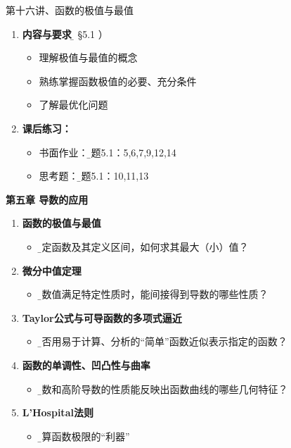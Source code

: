 \begin{frame}{第十六讲、函数的极值与最值}
	\linespread{1.5}
	\begin{enumerate}
	  \item {\bf 内容与要求}{\b（ \S 5.1 ）}
	  \begin{itemize}
	    \item 理解极值与最值的概念
	    \item 熟练掌握函数极值的必要、充分条件
	    \item 了解最优化问题
	  \vspace{1em}
	  \end{itemize}
	  \item {\bf 课后练习：}
	  \begin{itemize}
	    \item 书面作业：{\b 习题5.1：5,6,7,9,12,14}
 	    \item 思考题：{\b 习题5.1：10,11,13}
	  \end{itemize}
	\end{enumerate}
\end{frame}



\begin{frame}{\bf 第五章\; 导数的应用}
	\linespread{1.2}
	\begin{enumerate}\pause 
	  \item {\bf 函数的极值与最值}
	  \begin{itemize}
	    \item {\b 给定函数及其定义区间，如何求其最大（小）值？}
	  \end{itemize}\pause 
	  \item {\bf 微分中值定理}
	  \begin{itemize}
	    \item {\b 函数值满足特定性质时，能间接得到导数的哪些性质？}
	  \end{itemize}\pause 
	  \item {\bf Taylor公式与可导函数的多项式逼近}
	  \begin{itemize}
	    \item {\b 能否用易于计算、分析的“简单”函数近似表示指定的函数？}
	  \end{itemize}\pause 
	  \item {\bf 函数的单调性、凹凸性与曲率}
	  \begin{itemize}
	    \item {\b 导数和高阶导数的性质能反映出函数曲线的哪些几何特征？}
	  \end{itemize}\pause 
	  \item {\bf L'Hospital法则}
	  \begin{itemize}
	    \item {\b 计算函数极限的“利器”}
	  \end{itemize}
	\end{enumerate}
\end{frame}

